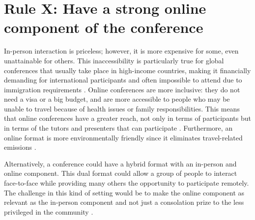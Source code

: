 \documentclass[10pt,letterpaper]{article}
\begin{document}
\section{Rule X: Have a strong online component of the conference} 
\label{rule_online}
In-person interaction is priceless; however, it is more expensive for some, even unattainable for others. This inaccessibility is particularly true for global conferences that usually take place in high-income countries, making it financially demanding for international participants and often impossible to attend due to immigration requirements \cite{arendDisparityConferenceRegistration2019,gewinWhatScientistsShould2019}. Online conferences are more inclusive: they do not need a visa or a big budget, and are more accessible to people who may be unable to travel because of health issues or family responsibilities. This means that online conferences have a greater reach, not only in terms of participants but in terms of the tutors and presenters that can participate \cite{atkinsonJournalMedicine20202021}. Furthermore, an online format is more environmentally friendly since it eliminates travel-related emissions \cite{sarabipourChangingScientificMeetings2021,ninerBetterWhomLeveling2021, gattrellComparisonCarbonCosts}.

Alternatively, a conference could have a hybrid format with an in-person and online component. This dual format could allow a group of people to interact face-to-face while providing many others the opportunity to participate remotely. The challenge in this kind of setting would be to make the online component as relevant as the in-person component and not just a consolation prize to the less privileged in the community \cite{ninerBetterWhomLeveling2021}. 
\end{document}
